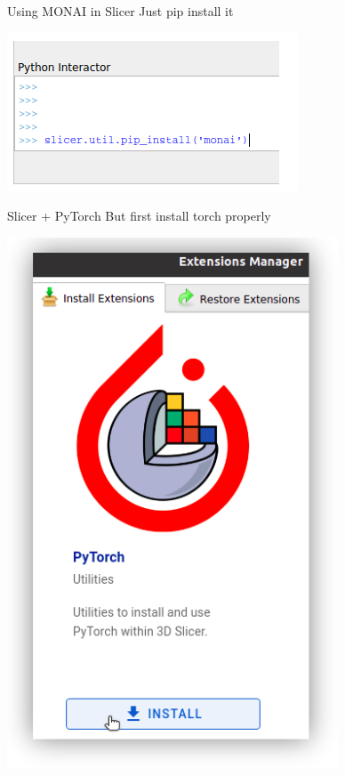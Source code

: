 \documentclass[10pt,aspectratio=169,dvipsnames]{beamer}
\begin{document}
\begin{frame}{Using MONAI in Slicer}
Just pip install it
\begin{center}
	\includegraphics[scale=1]{figures/slicer_pip_install}
\end{center}
\end{frame}

\begin{frame}{Slicer + PyTorch}
But first install torch properly
\begin{center}
	\includegraphics[scale=0.4]{figures/slicer-pytorch1}
	\hspace{3em}

\end{center}
\end{frame}
\end{document}
